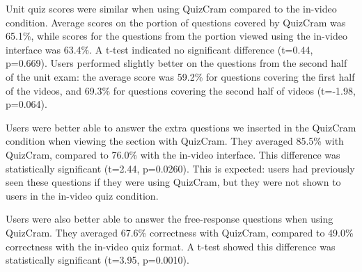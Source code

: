 \documentclass{chi-ext}
\begin{document}


Unit quiz scores were similar when using QuizCram compared to the in-video condition. Average scores on the portion of questions covered by QuizCram was 65.1\%, while scores for the questions from the portion viewed using the in-video interface was 63.4\%. A t-test indicated no significant difference (t=0.44, p=0.669). Users performed slightly better on the questions from the second half of the unit exam: the average score was 59.2\% for questions covering the first half of the videos, and 69.3\% for questions covering the second half of videos (t=-1.98, p=0.064).



Users were better able to answer the extra questions we inserted in the QuizCram condition when viewing the section with QuizCram. They averaged 85.5\% with QuizCram, compared to 76.0\% with the in-video interface. This difference was statistically significant (t=2.44, p=0.0260). This is expected: users had previously seen these questions if they were using QuizCram, but they were not shown to users in the in-video quiz condition.

Users were also better able to answer the free-response questions when using QuizCram. They averaged 67.6\% correctness with QuizCram, compared to 49.0\% correctness with the in-video quiz format. A t-test showed this difference was statistically significant (t=3.95, p=0.0010). %
\end{document}
